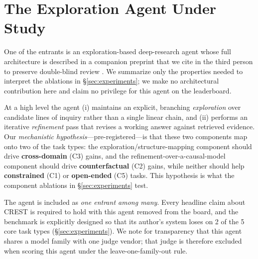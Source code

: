 \section{The Exploration Agent Under Study}
\label{sec:caesar}

One of the entrants is an exploration-based deep-research agent whose full architecture is
described in a companion preprint that we cite in the third person to preserve double-blind review
\citep{caesar2026}. We summarize only the properties needed to interpret the ablations in
\S\ref{sec:experiments}; we make no architectural contribution here and claim no privilege for
this agent on the leaderboard.

At a high level the agent (i) maintains an explicit, branching \emph{exploration} over candidate
lines of inquiry rather than a single linear chain, and (ii) performs an iterative
\emph{refinement} pass that revises a working answer against retrieved evidence. Our
\emph{mechanistic hypothesis}---pre-registered---is that these two components map onto two of the
task types: the exploration/structure-mapping component should drive \textbf{cross-domain} (C3)
gains, and the refinement-over-a-causal-model component should drive \textbf{counterfactual} (C2)
gains, while neither should help \textbf{constrained} (C1) or \textbf{open-ended} (C5) tasks. This
hypothesis is what the component ablations in \S\ref{sec:experiments} test.

The agent is included as \emph{one entrant among many}. Every headline claim about CREST is
required to hold with this agent removed from the board, and the benchmark is explicitly designed
so that its author's system loses on 2 of the 5 core task types (\S\ref{sec:experiments}). We note
for transparency that this agent shares a model family with one judge vendor; that judge is
therefore excluded when scoring this agent under the leave-one-family-out rule.
